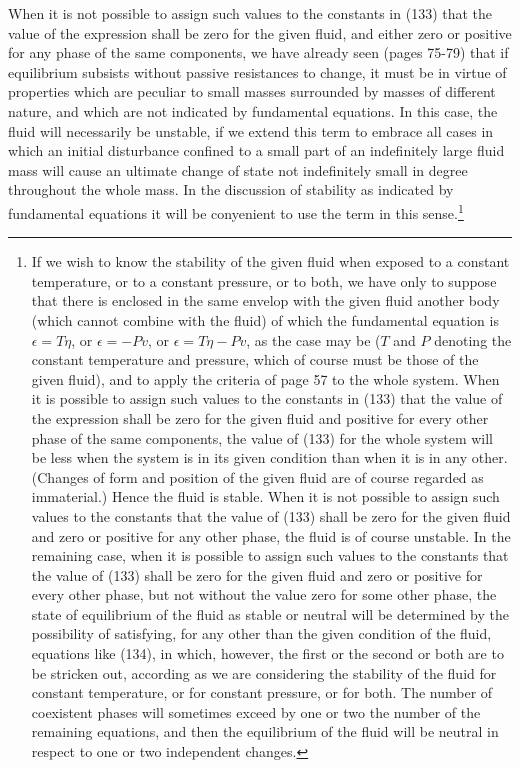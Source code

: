 \documentclass[12pt]{article}
\begin{document}
When it is not possible to assign such values to the constants in (133) that the value of the expression shall be zero for the given fluid, and either zero or positive for any phase of the same components, we have already seen (pages 75-79) that if equilibrium subsists without passive resistances to change, it must be in virtue of properties which are peculiar to small masses surrounded by masses of different nature, and which are not indicated by fundamental equations. In this case, the fluid will necessarily be unstable, if we extend this term to embrace all cases in which an initial disturbance confined to a small part of an indefinitely large fluid mass will cause an ultimate change of state not indefinitely small in degree throughout the whole mass. In the discussion of stability as indicated by fundamental equations it will be conyenient to use the term in this sense.\footnote{If we wish to know the stability of the given fluid when exposed to a constant temperature, or to a constant pressure, or to both, we have only to suppose that there is enclosed in the same envelop with the given fluid another body (which cannot combine with the fluid) of which the fundamental equation is $\epsilon= T\eta$, or $\epsilon= - Pv$, or $\epsilon= T\eta - Pv$, as the case may be ($T$ and $P$ denoting the constant temperature and pressure, which of course must be those of the given fluid), and to apply the criteria of page 57 to the whole system.  When it is possible to assign such values to the constants in (133) that the value of the expression shall be zero for the given fluid and positive for every other phase of the same components, the value of (133) for the whole system will be less when the system is in its given condition than when it is in any other. (Changes of form and position of the given fluid are of course regarded as immaterial.) Hence the fluid is stable. When it is not possible to assign such values to the constants that the value of (133) shall be zero for the given fluid and zero or positive for any other phase, the fluid is of course unstable. In the remaining case, when it is possible to assign such values to the constants that the value of (133) shall be zero for the given fluid and zero or positive for every other phase, but not without the value zero for some other phase, the state of equilibrium of the fluid as stable or neutral will be determined by the possibility of satisfying, for any other than the given condition of the fluid, equations like (134), in which, however, the first or the second or both are to be stricken out, according as we are considering the stability of the fluid for constant temperature, or for constant pressure, or for both.  The number of coexistent phases will sometimes exceed by one or two the number of the remaining equations, and then the equilibrium of the fluid will be neutral in respect to one or two independent changes.}
\end{document}

